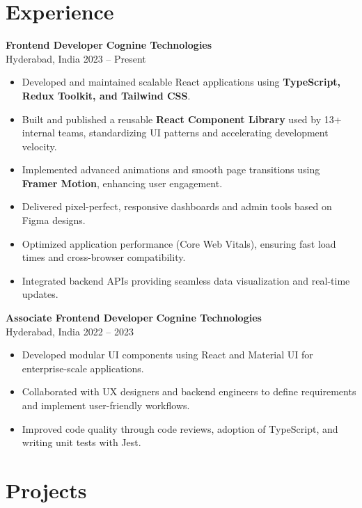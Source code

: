 \documentclass[11pt]{article}
\begin{document}
\section*{Experience}

\textbf{Frontend Developer} \hfill \textbf{Cognine Technologies} \\
Hyderabad, India \hfill 2023 -- Present
\begin{itemize}
    \item Developed and maintained scalable React applications using \textbf{TypeScript, Redux Toolkit, and Tailwind CSS}.
    \item Built and published a reusable \textbf{React Component Library} used by 13+ internal teams, standardizing UI patterns and accelerating development velocity.
    \item Implemented advanced animations and smooth page transitions using \textbf{Framer Motion}, enhancing user engagement.
    \item Delivered pixel-perfect, responsive dashboards and admin tools based on Figma designs.
    \item Optimized application performance (Core Web Vitals), ensuring fast load times and cross-browser compatibility.
    \item Integrated backend APIs providing seamless data visualization and real-time updates.
\end{itemize}

\textbf{Associate Frontend Developer} \hfill \textbf{Cognine Technologies} \\
Hyderabad, India \hfill 2022 -- 2023
\begin{itemize}
    \item Developed modular UI components using React and Material UI for enterprise-scale applications.
    \item Collaborated with UX designers and backend engineers to define requirements and implement user-friendly workflows.
    \item Improved code quality through code reviews, adoption of TypeScript, and writing unit tests with Jest.
\end{itemize}

\section*{Projects}
\end{document}
